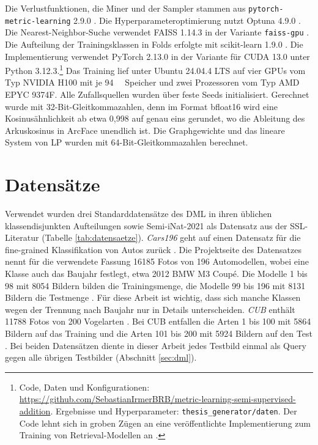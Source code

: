 Die Verlustfunktionen, die Miner und der Sampler stammen aus \texttt{pytorch-metric-\allowbreak learning} 2.9.0 \cite{musgrave_pytorch_2020}. Die Hyperparameteroptimierung nutzt Optuna 4.9.0 \cite{akiba_optuna_2019}. Die Nearest-Neighbor-Suche verwendet FAISS 1.14.3 in der Variante \texttt{faiss-gpu} \cite{douze_faiss_2024, johnson_billion-scale_2021}. Die Aufteilung der Trainingsklassen in Folds erfolgte mit scikit-learn 1.9.0 \cite{pedregosa_scikit-learn_2011}. Die Implementierung verwendet PyTorch 2.13.0 in der Variante für CUDA 13.0 \cite{ansel_pytorch_2024} unter Python 3.12.3.\footnote{Code, Daten und Konfigurationen: \url{https://github.com/SebastianIrmerBRB/metric-learning-semi-supervised-addition}. Ergebnisse und Hyperparameter: \texttt{thesis\_generator/daten}. Der Code lehnt sich in groben Zügen an eine veröffentlichte Implementierung zum Training von Retrieval-Modellen an \cite{berton_all_2025}.} Das Training lief unter Ubuntu 24.04.4 LTS auf vier \acp{GPU} vom Typ NVIDIA H100 mit je \SI{94}{\giga\byte} Speicher und zwei Prozessoren vom Typ AMD EPYC 9374F. Alle Zufallsquellen wurden über feste Seeds initialisiert. Gerechnet wurde mit 32-Bit-Gleitkommazahlen, denn im Format bfloat16 wird eine Kosinusähnlichkeit ab etwa 0,998 auf genau eins gerundet, wo die Ableitung des Arkuskosinus in ArcFace unendlich ist. Die Graphgewichte und das lineare System von \ac{LP} wurden mit 64-Bit-Gleitkommazahlen berechnet.

\section{Datensätze}
\label{sec:daten}

Verwendet wurden drei Standarddatensätze des \ac{DML} in ihren üblichen klassendisjunkten Aufteilungen sowie Semi-iNat-2021 als Datensatz aus der \ac{SSL}-Literatur (Tabelle \ref{tab:datensaetze}). \emph{Cars196} geht auf einen Datensatz für die fine-grained Klassifikation von Autos zurück \cite{krause_3d_2013}. Die Projektseite des Datensatzes nennt für die verwendete Fassung \num{16185} Fotos von 196 Automodellen, wobei eine Klasse auch das Baujahr festlegt, etwa 2012 BMW M3 Coupé. Die Modelle 1 bis 98 mit \num{8054} Bildern bilden die Trainingsmenge, die Modelle 99 bis 196 mit \num{8131} Bildern die Testmenge \cite{song_deep_2016}. Für diese Arbeit ist wichtig, dass sich manche Klassen wegen der Trennung nach Baujahr nur in Details unterscheiden. \emph{\ac{CUB}} enthält \num{11788} Fotos von 200 Vogelarten \cite{wah_caltech-ucsd_2011}. Bei \ac{CUB} entfallen die Arten 1 bis 100 mit \num{5864} Bildern auf das Training und die Arten 101 bis 200 mit \num{5924} Bildern auf den Test \cite{song_deep_2016}. Bei beiden Datensätzen diente in dieser Arbeit jedes Testbild einmal als Query gegen alle übrigen Testbilder (Abschnitt \ref{sec:dml}).

